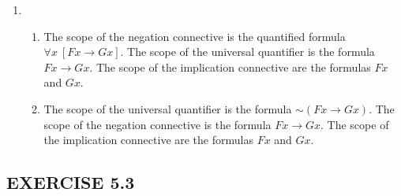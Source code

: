 \documentclass[a4paper,12pt]{article}
\newcommand{\ra}{\rightarrow}
\newcommand{\s}{\sim}
\newcommand{\all}{\forall}
\begin{document}
\begin{enumerate}[label=\arabic*,leftmargin=*]
        \item
            \begin{enumerate}[label=(\roman*),leftmargin=*]
                \item The scope of the negation connective is the quantified formula $\all x \ [Fx \ra Gx]$. The scope of the universal quantifier is the formula $Fx \ra Gx$. The scope of the implication connective are the formulas $Fx$ and $Gx$.
                \item The scope of the universal quantifier is the formula $\s (Fx \ra Gx)$. The scope of the negation connective is the formula $Fx \ra Gx$. The scope of the implication connective are the formulas $Fx$ and $Gx$.
            \end{enumerate}

    \end{enumerate}

    \newpage

    \subsection*{EXERCISE 5.3}
\end{document}
